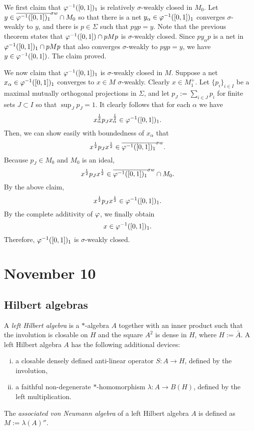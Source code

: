 \documentclass{../../../small}
\begin{document}
\begin{pf}
We first claim that $\varphi^{-1}([0,1])_1$ is relatively $\sigma$-weakly closed in $M_0$.
Let $y\in\overline{\varphi^{-1}([0,1])_1}^{\sigma w}\cap M_0$ so that there is a net $y_\alpha\in\varphi^{-1}([0,1])_1$ converges $\sigma$-weakly to $y$, and there is $p\in\Sigma$ such that $pyp=y$.
Note that the previous theorem states that $\varphi^{-1}([0,1])\cap pMp$ is $\sigma$-weakly closed.
Since $py_\alpha p$ is a net in $\varphi^{-1}([0,1])_1\cap pMp$ that also converges $\sigma$-weakly to $pyp=y$, we have $y\in\varphi^{-1}([0,1])$.
The claim proved.

We now claim that $\varphi^{-1}([0,1])_1$ is $\sigma$-weakly closed in $M$.
Suppose a net $x_\alpha\in\varphi^{-1}([0,1])_1$ converges to $x\in M$ $\sigma$-weakly.
Clearly $x\in M_1^+$.
Let $\{p_i\}_{i\in I}$ be a maximal mutually orthogonal projections in $\Sigma$, and let $p_J:=\sum_{i\in J}p_i$ for finite sets $J\subset I$ so that $\sup_Jp_J=1$.
It clearly follows that for each $\alpha$ we have
\[x_\alpha^{\frac12}p_Jx_\alpha^{\frac12}\in\varphi^{-1}([0,1])_1.\]
Then, we can show easily with boundedness of $x_\alpha$ that
\[x^{\frac12}p_Jx^{\frac12}\in\overline{\varphi^{-1}([0,1])_1}^{\sigma w}.\]
Because $p_J\in M_0$ and $M_0$ is an ideal, 
\[x^{\frac12}p_Jx^{\frac12}\in\overline{\varphi^{-1}([0,1])_1}^{\sigma w}\cap M_0.\]
By the above claim,
\[x^{\frac12}p_Jx^{\frac12}\in\varphi^{-1}([0,1])_1.\]
By the complete additivity of $\varphi$, we finally obtain
\[x\in\varphi^{-1}([0,1])_1.\]
Therefore, $\varphi^{-1}([0,1])_1$ is $\sigma$-weakly closed.
\end{pf}





\newpage
\section{November 10}
\subsection{Hilbert algebras}

\begin{defn}
A \emph{left Hilbert algebra} is a $*$-algebra $A$ together with an inner product such that the involution is closable on $H$ and the square $A^2$ is dense in $H$, where $H:=\bar A$.
A left Hilbert algebra $A$ has the following additional devices:
\begin{enumerate}[(i)]
\item a closable densely defined anti-linear operator $S:A\to H$, defined by the involution,
\item a faithful non-degenerate $*$-homomorphism $\lambda:A\to B(H)$, defined by the left multiplication.
\end{enumerate}
The \emph{associated von Neumann algebra} of a left Hilbert algebra $A$ is defined as $M:=\lambda(A)''$.
\end{defn}
\end{document}
